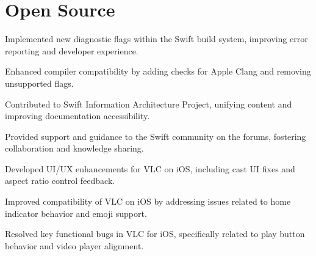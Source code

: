 \documentclass{fonts}
\begin{document}

\section{Open Source}

\textbf{}
\begin{tightemize}
    \item Implemented new diagnostic flags within the Swift build system, improving error reporting and developer experience.
    \item Enhanced compiler compatibility by adding checks for Apple Clang and removing unsupported flags.
    \item Contributed to Swift Information Architecture Project, unifying content and improving documentation accessibility.
    \item Provided support and guidance to the Swift community on the forums, fostering collaboration and knowledge sharing.
\end{tightemize}
\sectionsep

\textbf{}
\begin{tightemize}
     \item Developed UI/UX enhancements for VLC on iOS, including cast UI fixes and aspect ratio control feedback.
     \item Improved compatibility of VLC on iOS by addressing issues related to home indicator behavior and emoji support.
     \item Resolved key functional bugs in VLC for iOS, specifically related to play button behavior and video player alignment.
\end{tightemize}
\sectionsep


\end{document}
